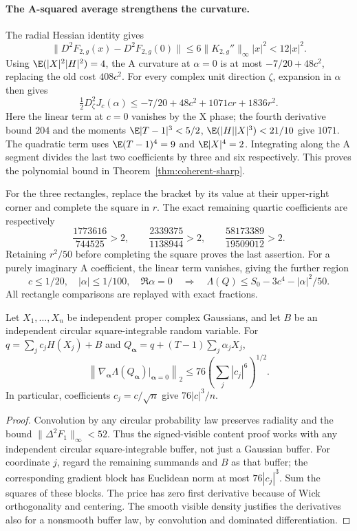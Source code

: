 \paragraph{The A-squared average strengthens the curvature.}
The radial Hessian identity gives
\[
 \|D^2F_{2,g}(x)-D^2F_{2,g}(0)\|
 \le6\|K_{2,g}''\|_\infty |x|^2<12|x|^2.
\]
Using $\E(|X|^2|H|^2)=4$, the A curvature at $\alpha=0$ is at most
$-7/20+48c^2$, replacing the old cost $408c^2$.
For every complex unit direction $\zeta$, expansion in $\alpha$ then gives
\[
 \tfrac12D_\zeta^2J_c(\alpha)
 \le-7/20+48c^2+1071cr+1836r^2.
\]
Here the linear term at $c=0$ vanishes by the X phase; the fourth
derivative bound $204$ and the moments
$\E|T-1|^3<5/2$, $\E(|H||X|^3)<21/10$ give $1071$.
The quadratic term uses $\E(T-1)^4=9$ and $\E|X|^4=2$.
Integrating along the A segment divides the last two coefficients
by three and six respectively. This proves the polynomial bound in
Theorem~\ref{thm:coherent-sharp}.

For the three rectangles, replace the bracket by its value at their
upper-right corner and complete the square in $r$. The exact
remaining quartic coefficients are respectively
\[
 \frac{1773616}{744525}>2,\qquad
 \frac{2339375}{1138944}>2,\qquad
 \frac{58173389}{19509012}>2.
\]
Retaining $r^2/50$ before completing the square proves the last
assertion. For a purely imaginary A coefficient, the linear term
vanishes, giving the further region
\[
 c\le1/20,\quad |\alpha|\le1/100,\quad\Re\alpha=0
 \quad\Longrightarrow\quad
 \Lambda(Q)\le S_0-3c^4-|\alpha|^2/50.
\]
All rectangle comparisons are replayed with exact fractions.

\begin{corollary}
\label{cor:coherent-diffuse-content}
Let $X_1,\ldots,X_n$ be independent proper complex Gaussians, and let
$B$ be an independent circular square-integrable random variable.
For $q=\sum_j c_jH(X_j)+B$ and
$Q_{\boldsymbol\alpha}=q+(T-1)\sum_j\alpha_jX_j$,
\[
 \left\|\nabla_{\boldsymbol\alpha}
          \Lambda(Q_{\boldsymbol\alpha})\big|_{\boldsymbol\alpha=0}
 \right\|_2
 \le76\left(\sum_j|c_j|^6\right)^{1/2}.
\]
In particular, coefficients $c_j=c/\sqrt n$ give $76|c|^3/n$.
\end{corollary}
\begin{proof}
Convolution by any circular probability law preserves radiality and
the bound $\|\Delta^2F_1\|_\infty<52$. Thus the signed-visible content
proof works with any independent circular square-integrable buffer,
not just a Gaussian buffer. For coordinate $j$, regard the remaining
summands and $B$ as that buffer; the corresponding gradient block
has Euclidean norm at most $76|c_j|^3$. Sum the squares of these
blocks. The price has zero first derivative because of Wick
orthogonality and centering. The smooth visible density justifies
the derivatives also for a nonsmooth buffer law, by convolution and
dominated differentiation.
\end{proof}

